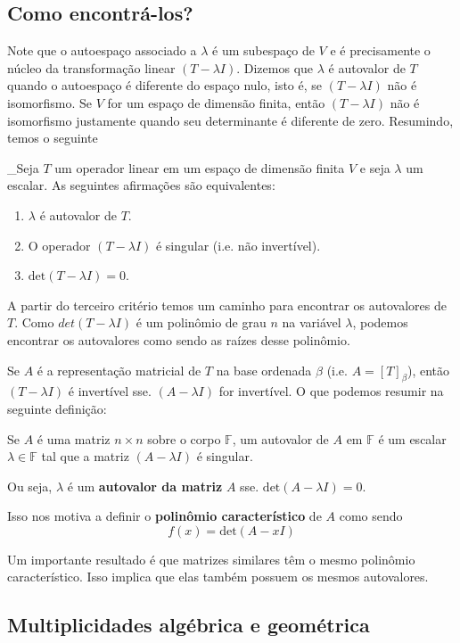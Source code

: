 \documentclass[12pt,a4paper]{article}
\begin{document}
\subsection{Como encontrá-los?}

Note que o autoespaço associado a $\lambda$ é um subespaço de $V$ e é precisamente o núcleo da transformação linear $(T - \lambda I)$. Dizemos que $\lambda$ é autovalor de $T$ quando o autoespaço é diferente do espaço nulo, isto é, se $(T- \lambda I)$ não é isomorfismo. Se $V$ for um espaço de dimensão finita, então $(T- \lambda I)$ não é isomorfismo justamente quando seu determinante é diferente de zero. Resumindo, temos o seguinte

\begin{teorema}{}
_Seja $T$ um operador linear em um espaço de dimensão finita $V$ e seja $\lambda$ um escalar. As seguintes afirmações são equivalentes:
\begin{enumerate}
\item $\lambda$ é autovalor de $T$.
\item O operador $(T- \lambda I)$ é singular (i.e. não invertível).
\item $\text{det}(T - \lambda I) = 0$.
\end{enumerate}
\end{teorema}

A partir do terceiro critério temos um caminho para encontrar os autovalores de $T$. Como $det(T - \lambda I)$ é um polinômio de grau $n$ na variável $\lambda$, podemos encontrar os autovalores como sendo as raízes desse polinômio.

Se $A$ é a representação matricial de $T$ na base ordenada $\beta$ (i.e. $A = [T]_\beta$), então $(T-\lambda I)$ é invertível sse. $(A - \lambda I)$ for invertível. O que podemos resumir na seguinte definição:

Se $A$ é uma matriz $n \times n$ sobre o corpo $\mathbb{F}$, um autovalor de $A$ em $\mathbb{F}$ é um escalar $\lambda \in \mathbb{F}$ tal que a matriz $(A - \lambda I)$ é singular.

Ou seja, $\lambda$ é um \textbf{autovalor da matriz} $A$ sse. $\text{det}(A-\lambda I) = 0$.

Isso nos motiva a definir o \textbf{polinômio característico} de $A$ como sendo \[ f(x) = \text{det}(A-xI) \]

Um importante resultado é que matrizes similares têm o mesmo polinômio característico. Isso implica que elas também possuem os mesmos autovalores.

\subsection{Multiplicidades algébrica e geométrica}
\end{document}
